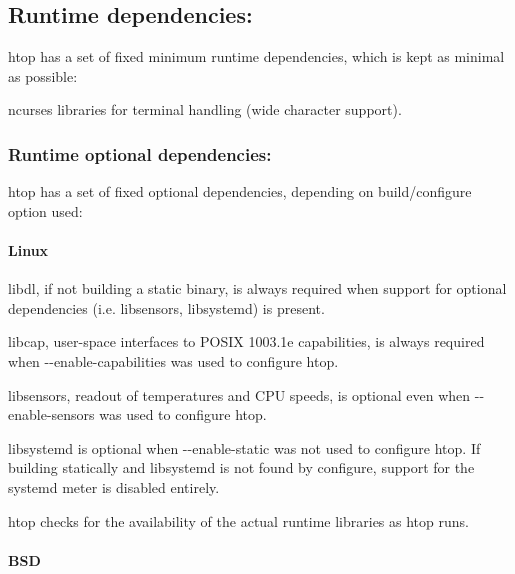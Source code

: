 \subsection*{Runtime dependencies\+:}

{\ttfamily htop} has a set of fixed minimum runtime dependencies, which is kept as minimal as possible\+:
\begin{DoxyItemize}
\item {\ttfamily ncurses} libraries for terminal handling (wide character support).
\end{DoxyItemize}

\subsubsection*{Runtime optional dependencies\+:}

{\ttfamily htop} has a set of fixed optional dependencies, depending on build/configure option used\+:

\paragraph*{Linux}


\begin{DoxyItemize}
\item {\ttfamily libdl}, if not building a static binary, is always required when support for optional dependencies (i.\+e. {\ttfamily libsensors}, {\ttfamily libsystemd}) is present.
\item {\ttfamily libcap}, user-\/space interfaces to P\+O\+S\+IX 1003.\+1e capabilities, is always required when {\ttfamily -\/-\/enable-\/capabilities} was used to configure {\ttfamily htop}.
\item {\ttfamily libsensors}, readout of temperatures and C\+PU speeds, is optional even when {\ttfamily -\/-\/enable-\/sensors} was used to configure {\ttfamily htop}.
\item {\ttfamily libsystemd} is optional when {\ttfamily -\/-\/enable-\/static} was not used to configure {\ttfamily htop}. If building statically and {\ttfamily libsystemd} is not found by {\ttfamily configure}, support for the systemd meter is disabled entirely.
\end{DoxyItemize}

{\ttfamily htop} checks for the availability of the actual runtime libraries as {\ttfamily htop} runs.

\paragraph*{B\+SD}

